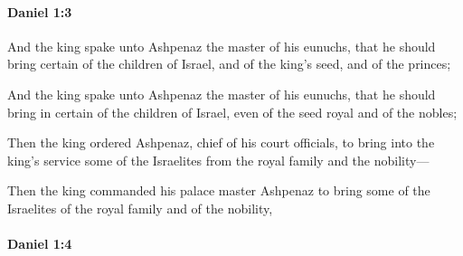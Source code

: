 		\paragraph{Daniel 1:3} %
			\label{DANIEL-1-3}

			And the king spake unto Ashpenaz the master of his eunuchs, that he should bring certain of the children of Israel, and of the king’s seed, and of the princes;

			\begin{versebox}
					\item[BHS] 
					\item[LXX] 
					\item[ASV] And the king spake unto Ashpenaz the master of his eunuchs, that he should bring in certain of the children of Israel, even of the seed royal and of the nobles;
					\item[NIV] Then the king ordered Ashpenaz, chief of his court officials, to bring into the king’s service some of the Israelites from the royal family and the nobility—
					\item[NRSV] Then the king commanded his palace master Ashpenaz to bring some of the Israelites of the royal family and of the nobility,
			\end{versebox}

		\paragraph{Daniel 1:4} %
			\label{DANIEL-1-4}

